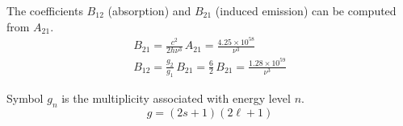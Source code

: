 \documentclass[12pt]{article}
\begin{document}
\noindent
The coefficients $B_{12}$ (absorption) and $B_{21}$ (induced emission) can be computed from $A_{21}$.
\begin{gather*}
B_{21}=\frac{c^2}{2h\nu^3}\,A_{21}=
\frac{4.25\times10^{58}}{\nu^3}
\\[2ex]
B_{12}=\frac{g_2}{g_1}\,B_{21}=\frac{6}{2}\,B_{21}
=\frac{1.28\times10^{59}}{\nu^3}
\end{gather*}

\noindent
Symbol $g_n$ is the multiplicity associated with energy level $n$.
\begin{equation*}
g=(2s+1)(2\ell+1)
\end{equation*}
\end{document}
